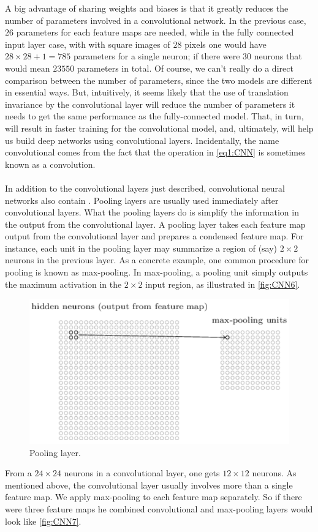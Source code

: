 {A big advantage of sharing weights and biases is that it greatly reduces the number of parameters involved in a convolutional network. In the previous case, $26$ parameters for each feature maps are needed, while in the fully connected input layer case, with with square images of $28$ pixels one would have $28\times 28+1 = 785$ parameters for a single neuron; if there were $30$ neurons that would mean $23550$ parameters in total.
Of course, we can't really do a direct comparison between the number of parameters, since the two models are different in essential ways. But, intuitively, it seems likely that the use of translation invariance by the convolutional layer will reduce the number of parameters it needs to get the same performance as the fully-connected model. That, in turn, will result in faster training for the convolutional model, and, ultimately, will help us build deep networks using convolutional layers. Incidentally, the name convolutional comes from the fact that the operation in \autoref{eq1:CNN} is sometimes known as a convolution. 

\paragraph{} In addition to the convolutional layers just described, convolutional neural networks also contain . Pooling layers are usually used immediately after convolutional layers. What the pooling layers do is simplify the information in the output from the convolutional layer. A pooling layer takes each feature map output from the convolutional layer and prepares a condensed feature map. For instance, each unit in the pooling layer may summarize a region of (say) $2\times 2$ neurons in the previous layer. As a concrete example, one common procedure for pooling is known as max-pooling. In max-pooling, a pooling unit simply outputs the maximum activation in the $2\times 2$ input region, as illustrated in \autoref{fig:CNN6}.

\begin{figure}
\centering
\includegraphics[scale=0.5]{img/CNN6}
\caption{Pooling layer.}
\label{fig:CNN6}
\end{figure}
From a $24\times 24$ neurons in a convolutional layer, one gets $12\times 12$ neurons. As mentioned above, the convolutional layer usually involves more than a single feature map. We apply max-pooling to each feature map separately. So if there were three feature maps he combined convolutional and max-pooling layers would look like \autoref{fig:CNN7}.

}
